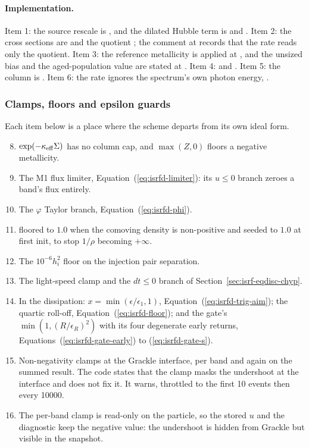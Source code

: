 \paragraph{Implementation.} Item 1: the source rescale is
, and the dilated Hubble term is
 and . Item 2: the cross sections are
 and the quotient ; the comment at
 records that the rate reads only the quotient. Item 3:
the reference metallicity is applied at , and the
unsized bias and the aged-population value are stated at
. Item 4:  and .
Item 5: the column is . Item 6: the rate ignores the
spectrum's own photon energy, .

\subsubsection{Clamps, floors and epsilon guards}

Each item below is a place where the scheme departs from its own ideal form.

\begin{enumerate}
  \setcounter{enumi}{7}
  \item $\exp(-\kappa_{\rm eff}\Sigma)$ has no column cap, and $\max(Z,0)$
    floors a negative metallicity.
  \item The M1 flux limiter, Equation~(\ref{eq:isrfd-limiter}): its
    $u \le 0$ branch zeroes a band's flux entirely.
  \item The $\varphi$ Taylor branch, Equation~(\ref{eq:isrfd-phi}).
  \item {} floored to $1.0$ when the comoving density is
    non-positive and seeded to $1.0$ at first
    init, to stop $1/\rho$ becoming $+\infty$.
  \item The $10^{-6}h_i^2$ floor on the injection pair separation.
  \item The light-speed clamp and the $dt \le 0$ branch of
    Section~\ref{sec:isrf-eqdisc-chyp}.
  \item In the dissipation: $x = \min(\epsilon/\epsilon_1, 1)$,
    Equation~(\ref{eq:isrfd-trig-aim}); the quartic roll-off,
    Equation~(\ref{eq:isrfd-floor}); and the gate's
    $\min(1, (R/\epsilon_R)^2)$ with its four degenerate early returns,
    Equations~(\ref{eq:isrfd-gate-early}) to (\ref{eq:isrfd-gate-s}).
  \item Non-negativity clamps at the Grackle interface, per band and again on
    the summed result. The
    code states that the clamp masks the undershoot at the interface
    and does not fix it. It warns,
    throttled to the first 10 events then every 10000.
  \item The per-band clamp is read-only on the
    particle, so the stored $u$ and the 
    diagnostic keep the negative value: the
    undershoot is hidden from Grackle but visible in the snapshot.
\end{enumerate}


